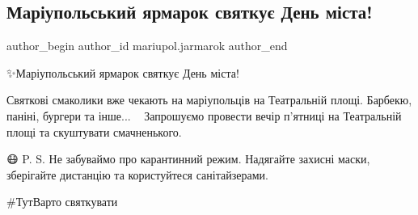  
 
 
 
 

\subsection{Маріупольський ярмарок  святкує День міста! }
\label{sec:25_09_2020.fb.mariupol.jarmarok.1.jarmarok_den_mista}

\ifcmt
 author_begin
   author_id mariupol.jarmarok
 author_end
\fi

✨Маріупольський ярмарок  святкує День міста! 

Святкові смаколики вже чекають на маріупольців на Театральній площі. Барбекю,
паніні, бургери та інше...🌮🥨🍢  Запрошуємо провести вечір п'ятниці на
Театральній площі та скуштувати смачненького.

😷 P. S. Не забуваймо про карантинний режим. Надягайте захисні маски, зберігайте
дистанцію та користуйтеся санітайзерами.

\#ТутВарто святкувати
